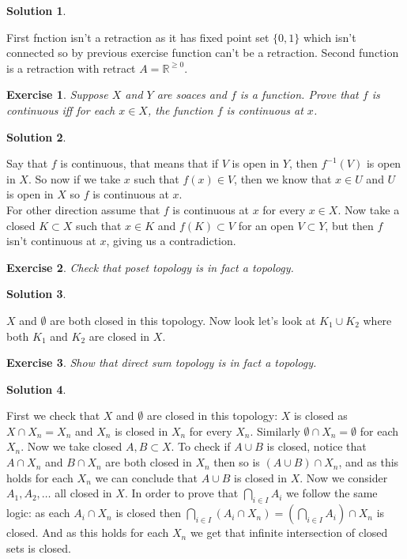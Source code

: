 \documentclass[11pt,a4paper]{article}
\newtheorem{Ex}{Exercise}
\newtheorem{Sol}{Solution}
\newcommand{\R}{\mathbb{R}}
\begin{document}
\begin{Sol}
\end{Sol}
\noindent First fnction isn't a retraction as it has fixed point set $\{0,1\}$ which isn't connected so by previous exercise function can't be a retraction. Second function is a retraction with retract $A = \R^{\ge 0}$.


\begin{Ex}
	Suppose $X$ and $Y$ are soaces and $f$ is a function. Prove that $f$ is continuous iff for each $x\in X$, the function $f$ is continuous at $x$.
\end{Ex}

\begin{Sol}\end{Sol}
\noindent Say that $f$ is continuous, that means that if $V$ is open in $Y$, then $f^{-1}(V)$ is open in $X$. So now if we take $x$ such that $f(x) \in V$, then we know that $x \in U$ and $U$ is open in $X$ so $f$ is continuous at $x$. \\
\noindent For other direction assume that $f$ is continuous at $x$ for every $x\in X$. Now take a closed $K \subset X$ such that $x\in K$ and $f(K) \subset V$ for an open $V \subset Y$, but then $f$ isn't continuous at $x$, giving us a contradiction. \\

\begin{Ex}
	Check that poset topology is in fact a topology.
\end{Ex}
\begin{Sol}
\end{Sol}
\noindent $X$ and $\emptyset$ are both closed in this topology. Now look let's look at $K_1 \cup K_2$ where both $K_1$ and $K_2$ are closed in $X$. 

\begin{Ex}
	Show that direct sum topology is in fact a topology.
\end{Ex}

\begin{Sol}
\end{Sol}
\noindent First we check that $X$ and $\emptyset$ are closed in this topology: $X$ is closed as $X \cap X_n = X_n$ and $X_n$ is closed in $X_n$ for every $X_n$. Similarly $\emptyset \cap X_n = \emptyset$ for each $X_n$. Now we take closed $A,B \subset X$. To check if $A\cup B$ is closed, notice that $A \cap X_n$ and $B \cap X_n$ are both closed in $X_n$ then so is $(A \cup B) \cap X_n$, and as this holds for each $X_n$ we can conclude that $A \cup B$ is closed in $X$. Now we consider $A_1, A_2,\dots$ all closed in $X$. In order to prove that $\bigcap_{i\in I}A_i$ we follow the same logic: as each $A_i \cap X_n$ is closed then $\bigcap_{i \in I}(A_i \cap X_n) = (\bigcap_{i\in I}A_i) \cap X_n$ is closed. And as this holds for each $X_n$ we get that infinite intersection of closed sets is closed. 
\end{document}
